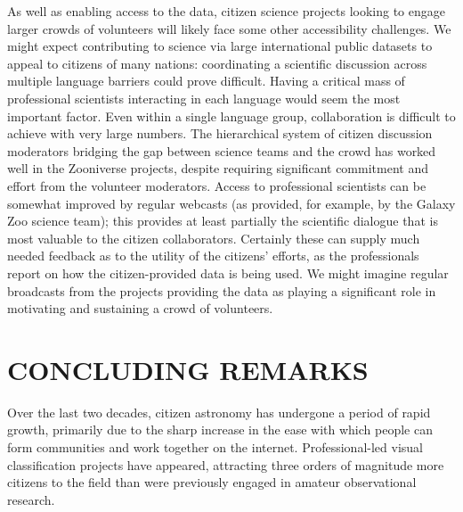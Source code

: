 \documentclass{ar2e}
\begin{document}
 


As well as enabling access to the data, citizen science projects looking to
engage larger crowds of volunteers will likely face some other accessibility
challenges. We might expect contributing to science via large international
public datasets to appeal to citizens of many nations: coordinating a scientific
discussion across multiple language barriers could prove difficult. Having a
critical mass of professional scientists interacting in each language would seem
the most important factor. Even within a single language group, collaboration is
difficult to achieve with  very large numbers. The hierarchical system of
citizen discussion  moderators bridging the gap between science teams and the
crowd has worked well in the Zooniverse projects, despite requiring significant
commitment and effort from the volunteer moderators. Access to professional
scientists can be somewhat improved by regular webcasts (as provided, for
example, by the Galaxy Zoo science team); this provides at least partially the
scientific dialogue that is most valuable to the citizen collaborators.
Certainly these can supply much needed feedback as to the utility of the
citizens' efforts, as the professionals report on how the citizen-provided data
is being used. We might imagine regular broadcasts from the projects providing
the data as playing a significant role in motivating and sustaining a crowd of
volunteers.



\section{CONCLUDING REMARKS}
\label{sec:conclusions}

Over the last two decades, citizen astronomy has undergone a period of rapid
growth, primarily due to the sharp increase in the ease with which people can
form communities and work together on the internet. Professional-led visual
classification projects have appeared, attracting three orders of magnitude
more citizens to the field than were previously engaged in amateur
observational research. 
\end{document}
